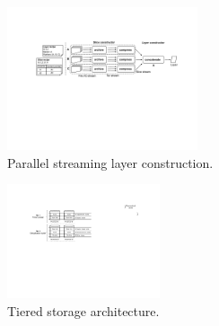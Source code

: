 

\begin{figure}[t]
	\centering
	\centering
	\includegraphics[width=0.5\textwidth]{graphs/sift-layer-construct.pdf}
	\caption{Parallel streaming layer construction.}
	\label{fig:construct}
\end{figure}

\begin{figure}[t]
	\centering
	\centering
	\includegraphics[width=0.4\textwidth]{graphs/sift-cache.pdf}
	\caption{Tiered storage architecture.}
	\label{fig:tieredstore}
\end{figure} 